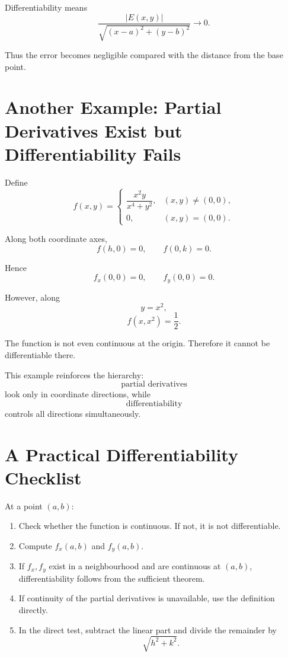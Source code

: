 \documentclass[11pt,oneside]{book}
\theoremstyle{studentthm}
\theoremstyle{definition}
\begin{document}
Differentiability means
\[
\frac{|E(x,y)|}
{\sqrt{(x-a)^2+(y-b)^2}}
\to0.
\]

Thus the error becomes negligible compared with the distance from the
base point.

\section{Another Example: Partial Derivatives Exist but Differentiability Fails}

Define
\[
f(x,y)
=
\begin{cases}
\dfrac{x^2y}{x^4+y^2},&(x,y)\ne(0,0),\\
0,&(x,y)=(0,0).
\end{cases}
\]

Along both coordinate axes,
\[
f(h,0)=0,
\qquad
f(0,k)=0.
\]

Hence
\[
f_x(0,0)=0,
\qquad
f_y(0,0)=0.
\]

However, along
\[
y=x^2,
\]
\[
f(x,x^2)=\frac12.
\]

The function is not even continuous at the origin. Therefore it cannot
be differentiable there.

This example reinforces the hierarchy:
\[
\text{partial derivatives}
\]
look only in coordinate directions, while
\[
\text{differentiability}
\]
controls all directions simultaneously.

\section{A Practical Differentiability Checklist}

At a point \((a,b)\):

\begin{enumerate}
\item Check whether the function is continuous. If not, it is not
differentiable.

\item Compute \(f_x(a,b)\) and \(f_y(a,b)\).

\item If \(f_x,f_y\) exist in a neighbourhood and are continuous at
\((a,b)\), differentiability follows from the sufficient theorem.

\item If continuity of the partial derivatives is unavailable, use the
definition directly.

\item In the direct test, subtract the linear part and divide the
remainder by
\[
\sqrt{h^2+k^2}.
\]
\end{enumerate}
\end{document}
